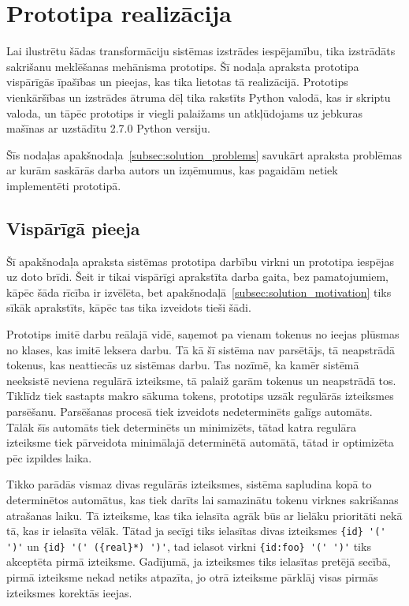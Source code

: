 \section{Prototipa realizācija}
Lai ilustrētu šādas transformāciju sistēmas izstrādes iespējamību, tika izstrādāts sakrišanu meklēšanas mehānisma prototips. Šī nodaļa apraksta prototipa vispārīgās īpašības un pieejas, kas tika lietotas tā realizācijā. Prototips vienkāršības un izstrādes ātruma dēļ tika rakstīts Python valodā, kas ir skriptu valoda, un tāpēc prototips ir viegli palaižams un atkļūdojams uz jebkuras mašīnas ar uzstādītu 2.7.0 Python versiju.

Šīs nodaļas apakšnodaļa~\ref{subsec:solution_problems} savukārt apraksta problēmas ar kurām saskārās darba autors un izņēmumus, kas pagaidām netiek implementēti prototipā.


\subsection{\label{subsec:solution_approach}Vispārīgā pieeja}
Šī apakšnodaļa apraksta sistēmas prototipa darbību virkni un prototipa iespējas uz doto brīdi. Šeit ir tikai vispārīgi aprakstīta darba gaita, bez pamatojumiem, kāpēc šāda rīcība ir izvēlēta, bet apakšnodaļā~\ref{subsec:solution_motivation} tiks sīkāk aprakstīts, kāpēc tas tika izveidots tieši šādi.

Prototips imitē darbu reālajā vidē, saņemot pa vienam tokenus no ieejas plūsmas no klases, kas imitē leksera darbu. Tā kā šī sistēma nav parsētājs, tā neapstrādā tokenus, kas neattiecās uz sistēmas darbu. Tas nozīmē, ka kamēr sistēmā neeksistē neviena regulārā izteiksme, tā palaiž garām tokenus un neapstrādā tos. Tiklīdz tiek sastapts makro sākuma tokens, prototips uzsāk regulārās izteiksmes parsēšanu. Parsēšanas procesā tiek izveidots nedeterminēts galīgs automāts. Tālāk šīs automāts tiek determinēts un minimizēts, tātad katra regulāra izteiksme tiek pārveidota minimālajā determinētā automātā, tātad ir optimizēta pēc izpildes laika.

Tikko parādās vismaz divas regulārās izteiksmes, sistēma sapludina kopā to determinētos automātus, kas tiek darīts lai samazinātu tokenu virknes sakrišanas atrašanas laiku. Tā izteiksme, kas tika ielasīta agrāk būs ar lielāku prioritāti nekā tā, kas ir ielasīta vēlāk. Tātad ja secīgi tiks ielasītas divas izteiksmes \verb|{id} '(' ')'| un \verb|{id} '(' ({real}*) ')'|, tad ielasot virkni \verb|{id:foo} '(' ')'| tiks akceptēta pirmā izteiksme. Gadījumā, ja izteiksmes tiks ielasītas pretējā secībā, pirmā izteiksme nekad netiks atpazīta, jo otrā izteiksme pārklāj visas pirmās izteiksmes korektās ieejas.

